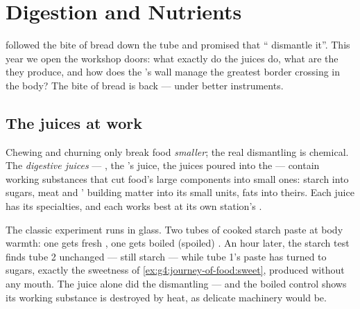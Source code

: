 \chapter{Digestion and Nutrients}\label{ch:g7:digestion-and-nutrients}

 followed the bite of bread down
the tube and promised that `` dismantle it''.
This year we open the workshop doors: what exactly do the
juices do, what are the  they produce, and how does
the 's wall manage the greatest border
crossing in the body? The bite of bread is back --- under
better instruments.

\section{The juices at work}

\begin{proposition}\label{prop:g7:digestion-and-nutrients:chemical}
Chewing and churning only break food \emph{smaller}; the
real dismantling is chemical. The \emph{digestive
juices} --- , the 's
juice, the juices poured into the  ---
contain working substances that cut food's large components
into small ones: starch into sugars, meat and '
building matter into its small units, fats into theirs.
Each juice has its specialties, and each works best at its
own station's .
\end{proposition}
\admitted

\begin{example}\label{ex:g7:digestion-and-nutrients:bench}
The classic experiment runs  in glass. Two tubes
of cooked starch paste at body warmth: one gets fresh
, one gets boiled (spoiled) . An hour later,
the starch test finds tube 2 unchanged --- still starch ---
while tube 1's paste has turned to sugars, exactly the
sweetness of \cref{ex:g4:journey-of-food:sweet}, produced
without any mouth. The juice alone did the dismantling ---
and the boiled control shows its working substance is
destroyed by heat, as delicate machinery would be.
\end{example}


